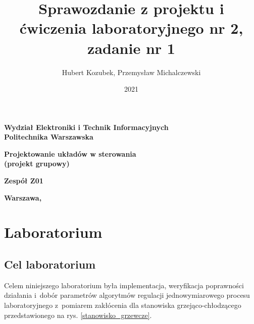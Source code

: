 \documentclass[a4paper,titlepage,11pt,twosides,floatssmall]{mwrep}
\begin{document}
\frenchspacing
\pagestyle{uheadings}

\title{\bf Sprawozdanie z projektu i ćwiczenia laboratoryjnego nr 2, zadanie nr 1\vskip 0.1cm}
\author{Hubert Kozubek, Przemysław Michalczewski}
\date{2021}

\makeatletter
\renewcommand{\maketitle}{\begin{titlepage}
\begin{center}{\LARGE {\bf
Wydział Elektroniki i Technik Informacyjnych}}\\
\vspace{0.4cm}
{\LARGE {\bf Politechnika Warszawska}}\\
\vspace{0.3cm}
\end{center}
\vspace{5cm}
\begin{center}
{\bf \LARGE Projektowanie układów w sterowania\\ (projekt grupowy) \vskip 0.1cm}
\end{center}
\vspace{1cm}
\begin{center}
{\bf \LARGE \@title}
\end{center}
\vspace{2cm}
\begin{center}
{\bf \LARGE Zespół Z01
\vskip 0.1cm}
\end{center}
\begin{center}
{\bf \Large \@author \par}
\end{center}
\vspace*{\stretch{6}}
\begin{center}
\bf{\large{Warszawa, \@date\vskip 0.1cm}}
\end{center}
\end{titlepage}
}
\makeatother

\maketitle

\tableofcontents

\chapter{Laboratorium}
\section{Cel laboratorium}
Celem niniejszego laboratorium była implementacja, weryfikacja poprawności działania i~dobór parametrów algorytmów regulacji jednowymiarowego procesu laboratoryjnego z~pomiarem zakłócenia dla stanowiska grzejąco-chłodzącego przedstawionego na rys. \ref{stanowisko_grzewcze}.
\end{document}
